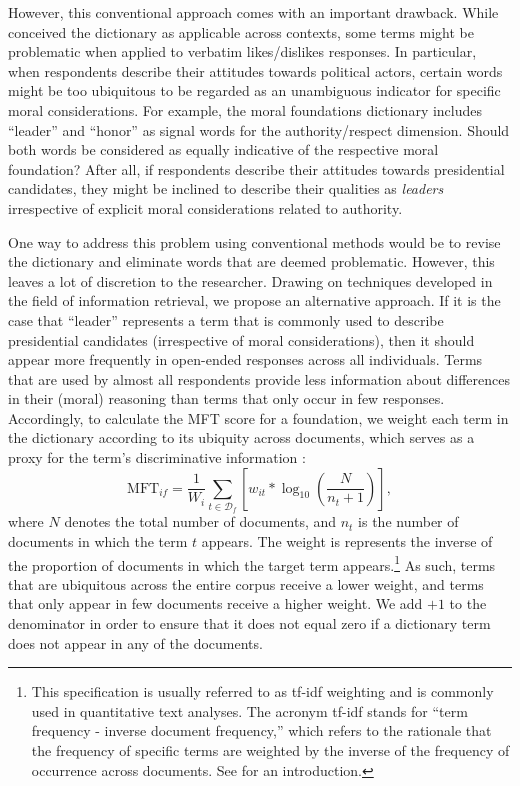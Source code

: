 \documentclass[12pt]{article}
\begin{document}
However, this conventional approach comes with an important drawback. While \citet{graham2009liberals} conceived the dictionary as applicable across contexts, some terms might be problematic when applied to verbatim likes/dislikes responses. In particular, when respondents describe their attitudes towards political actors, certain words might be too ubiquitous to be regarded as an unambiguous indicator for specific moral considerations. For example, the moral foundations dictionary includes ``leader'' and ``honor'' as signal words for the authority/respect dimension. Should both words be considered as equally indicative of the respective moral foundation? After all, if respondents describe their attitudes towards presidential candidates, they might be inclined to describe their qualities as \textit{leaders} irrespective of explicit moral considerations related to authority.

One way to address this problem using conventional methods would be to revise the dictionary and eliminate words that are deemed problematic. However, this leaves a lot of discretion to the researcher. Drawing on techniques developed in the field of information retrieval, we propose an alternative approach. If it is the case that ``leader'' represents a term that is commonly used to describe presidential candidates (irrespective of moral considerations), then it should appear more frequently in open-ended responses across all individuals. Terms that are used by almost all respondents provide less information about differences in their (moral) reasoning than terms that only occur in few responses. Accordingly, to calculate the MFT score for a foundation, we weight each term in the dictionary according to its ubiquity across documents, which serves as a proxy for the term's discriminative information \citep[c.f. for example][]{manning2008introduction}:
\begin{equation}
\text{MFT}_{if} = \dfrac{1}{W_i} \sum_{t \in \mathcal{D}_f} \left[ w_{it} * \log_{10}\left( \dfrac{N}{n_t+1}\right) \right],
\end{equation}
where $N$ denotes the total number of documents, and $n_t$ is the number of documents in which the term $t$ appears. The weight is represents the inverse of the proportion of documents in which the target term appears.\footnote{This specification is usually referred to as tf-idf weighting and is commonly used in quantitative text analyses. The acronym tf-idf stands for ``term frequency - inverse document frequency,'' which refers to the rationale that the frequency of specific terms are weighted by the inverse of the frequency of occurrence across documents. See \citet[ch. 6]{manning2008introduction} for an introduction.} As such, terms that are ubiquitous across the entire corpus receive a lower weight, and terms that only appear in few documents receive a higher weight. We add $+1$ to the denominator in order to ensure that it does not equal zero if a dictionary term does not appear in any of the documents.
\end{document}
